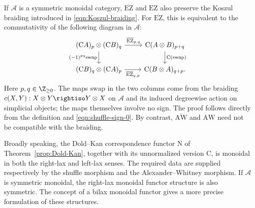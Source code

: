 \begin{remark}
	If $\mathcal{A}$ is a symmetric monoidal category,
	$\overline{\mathrm{EZ}}$ and $\mathrm{EZ}$ also preserve the Koszul
	braiding introduced in \eqref{eqn:Koszul-braiding}. For
	$\overline{\mathrm{EZ}}$, this is equivalent to the commutativity of the
	following diagram in $\mathcal{A}$:
	\[\begin{tikzcd}
		(\mathrm{C}A)_p \otimes (\mathrm{C}B)_q \arrow[r, "{\overline{\mathrm{EZ}}_{p, q}}"] \arrow[d, "{(-1)^{pq} \mathrm{swap}}"'] & \mathrm{C}(A \otimes B)_{p+q} \arrow[d, "{\mathrm{C}(\mathrm{swap})}"] \\
		(\mathrm{C}B)_q \otimes (\mathrm{C}A)_p \arrow[r, "{\overline{\mathrm{EZ}}_{q, p}}"'] & \mathrm{C}(B \otimes A)_{q+p}.
	\end{tikzcd}\]
	Here $p,q\in\Z_{\geq0}$. The maps $\mathrm{swap}$ in the two columns
	come from the braiding $c(X,Y):X\otimes Y\rightiso Y\otimes X$ on
	$\mathcal{A}$ and its induced degreewise action on simplicial objects;
	the maps themselves involve no sign. The proof follows directly from the
	definition and \eqref{eqn:shuffle-sign-0}. By contrast,
	$\overline{\mathrm{AW}}$ and $\mathrm{AW}$ need not be compatible with
	the braiding.

	Broadly speaking, the Dold--Kan correspondence functor $\mathrm{N}$ of
	Theorem~\ref{prop:Dold-Kan}, together with its unnormalized version
	$\mathrm{C}$, is monoidal in both the right-lax and left-lax senses. The
	required data are supplied respectively by the shuffle morphism and the
	Alexander--Whitney morphism. If $\mathcal{A}$ is symmetric monoidal, the
	right-lax monoidal functor structure is also symmetric. The concept of a
	bilax monoidal functor \cite[Chapters 3, 5]{AM10} gives a more precise
	formulation of these structures.

\end{remark}
